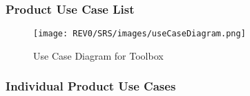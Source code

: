 \documentclass[12pt, titlepage]{article}
\begin{document}
\subsubsection{Product Use Case List}
\begin{figure}[H]
	    \begin{center}
    	    \texttt{[image: REV0/SRS/images/useCaseDiagram.png]}
    	    \caption{Use Case Diagram for Toolbox}
    	    \label{fig:Toolbox Use Case Diagram}
    	\end{center}
\end{figure}

\newpage

\subsubsection{Individual Product Use Cases}
\end{document}
